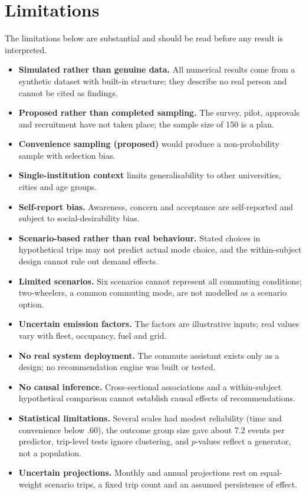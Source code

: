 \documentclass[11pt,a4paper]{article}
\begin{document}
\section{Limitations}
\label{sec:limits}

The limitations below are substantial and should be read before any result is interpreted.
\begin{itemize}[leftmargin=*]
\item \textbf{Simulated rather than genuine data.} All numerical results come from a synthetic dataset
with built-in structure; they describe no real person and cannot be cited as findings.
\item \textbf{Proposed rather than completed sampling.} The survey, pilot, approvals and recruitment
have not taken place; the sample size of 150 is a plan.
\item \textbf{Convenience sampling (proposed)} would produce a non-probability sample with selection
bias.
\item \textbf{Single-institution context} limits generalisability to other universities, cities and
age groups.
\item \textbf{Self-report bias.} Awareness, concern and acceptance are self-reported and subject to
social-desirability bias.
\item \textbf{Scenario-based rather than real behaviour.} Stated choices in hypothetical trips may not
predict actual mode choice, and the within-subject design cannot rule out demand effects.
\item \textbf{Limited scenarios.} Six scenarios cannot represent all commuting conditions;
two-wheelers, a common commuting mode, are not modelled as a scenario option.
\item \textbf{Uncertain emission factors.} The factors are illustrative inputs; real values vary with
fleet, occupancy, fuel and grid.
\item \textbf{No real system deployment.} The commute assistant exists only as a design; no
recommendation engine was built or tested.
\item \textbf{No causal inference.} Cross-sectional associations and a within-subject hypothetical
comparison cannot establish causal effects of recommendations.
\item \textbf{Statistical limitations.} Several scales had modest reliability (time and convenience
below $.60$), the outcome group size gave about 7.2 events per predictor, trip-level tests ignore
clustering, and $p$-values reflect a generator, not a population.
\item \textbf{Uncertain projections.} Monthly and annual projections rest on equal-weight scenario
trips, a fixed trip count and an assumed persistence of effect.
\end{itemize}
\end{document}
